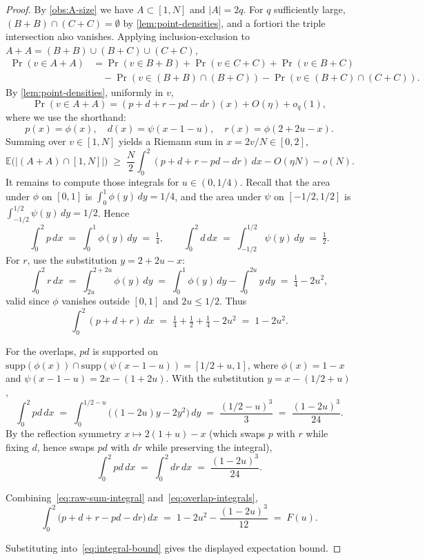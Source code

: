\documentclass[11pt]{amsart}
\begin{document}
\begin{proof}
   By \cref{obs:A-size} we have $A \subset [1,N]$ and $|A| = 2q$. For $q$ sufficiently large, $(B+B) \cap (C+C) = \emptyset$ by \cref{lem:point-densities}, and a fortiori the triple intersection also vanishes. Applying inclusion-exclusion to $A + A = (B + B) \cup (B + C) \cup (C + C)$,
\begin{align*}
\Pr(v\in A+A) &= \Pr(v\in B+B)+\Pr(v\in C+C)+\Pr(v\in B+C) \\
&\quad - \Pr(v\in(B+B)\cap(B+C)) - \Pr(v\in(B+C)\cap(C+C)).
\end{align*}
   By \cref{lem:point-densities}, uniformly in $v$,
   \[
      \Pr(v \in A + A) = (p + d + r - pd - dr)(x) + O(\eta) + o_q(1),
   \]
   where we use the shorthand:
   \[
      p(x) = \phi(x), \quad d(x) = \psi(x - 1 - u), \quad r(x) = \phi(2 + 2u - x).
   \]
   Summing over $v \in [1, N]$ yields a Riemann sum in $x = 2v/N \in [0,2]$,
   \begin{equation}\label{eq:integral-bound}
       \mathbb{E}\bigl(|(A + A) \cap [1, N]|\bigr) \;\geq\; \frac{N}{2} \int_0^2 (p + d + r - pd - dr)\, dx - O(\eta N) - o(N).
   \end{equation}
   It remains to compute those integrals for $u \in (0, 1/4)$.
Recall that the area under $\phi$ on $[0,1]$ is $\int_0^1\phi(y)\,dy=1/4$, and the area under $\psi$ on $[-1/2,1/2]$ is $\int_{-1/2}^{1/2}\psi(y)\,dy=1/2$. Hence
\[
\int_0^2 p\,dx \;=\; \int_0^1\phi(y)\,dy \;=\; \tfrac{1}{4}, \qquad
\int_0^2 d\,dx \;=\; \int_{-1/2}^{1/2}\psi(y)\,dy \;=\; \tfrac{1}{2}.
\]
For $r$, use the substitution $y=2+2u-x$:
\[
\int_0^2 r\,dx \;=\; \int_{2u}^{2+2u}\phi(y)\,dy \;=\; \int_0^1\phi(y)\,dy-\int_0^{2u}y\,dy \;=\; \tfrac{1}{4}-2u^2,
\]
valid since $\phi$ vanishes outside $[0,1]$ and $2u\le 1/2$. Thus
\begin{equation}\label{eq:raw-sum-integral}
\int_0^2(p+d+r)\,dx \;=\; \tfrac{1}{4}+\tfrac{1}{2}+\tfrac{1}{4}-2u^2 \;=\; 1-2u^2.
\end{equation}

For the overlaps, $pd$ is supported on
$\mathrm{supp}(\phi(x))\cap\mathrm{supp}(\psi(x-1-u))=[1/2+u,1]$, where
$\phi(x)=1-x$ and $\psi(x-1-u)=2x-(1+2u)$. With the substitution
$y=x-(1/2+u)$,
\[
\int_0^2 pd \,dx
\;=\; \int_0^{1/2-u}\!\!\bigl((1-2u)y-2y^2\bigr)\,dy
\;=\;\frac{(1/2-u)^3}{3} \;=\; \frac{(1-2u)^3}{24}.
\]
By the reflection symmetry $x\mapsto 2(1+u)-x$ (which swaps $p$ with $r$ while fixing $d$, hence swaps $pd$ with $dr$ while preserving the integral),
\begin{equation}\label{eq:overlap-integrals}
\int_0^2 pd \,dx \;=\; \int_0^2 dr \,dx \;=\; \frac{(1-2u)^3}{24}.
\end{equation}

Combining~\eqref{eq:raw-sum-integral} and~\eqref{eq:overlap-integrals},
\[
\int_0^2 \bigl(p+d+r-pd-dr\bigr)\,dx
\;=\; 1-2u^2-\frac{(1-2u)^3}{12}
\;=\; F(u).
\]

Substituting into~\eqref{eq:integral-bound} gives the displayed expectation bound.
\end{proof}
\end{document}
